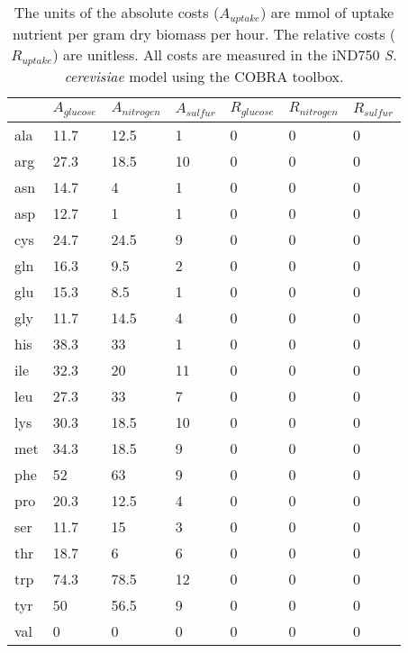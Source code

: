 \cleardoublepage

\begin{table}
\begin{footnotesize}
  \begin{tabular}{ p{1cm} *{6}{p{1.9cm}} }
  \toprule
      & $A_{glucose}$ & $A_{nitrogen}$ & $A_{sulfur}$ & $R_{glucose} $ & $R_{nitrogen}$ & $R_{sulfur}$ \\ \midrule
      ala & 11.7 & 12.5 & 1  & 0 & 0 & 0 \\
      arg & 27.3 & 18.5 & 10 & 0 & 0 & 0 \\
      asn & 14.7 & 4    & 1  & 0 & 0 & 0 \\
      asp & 12.7 & 1    & 1  & 0 & 0 & 0 \\
      cys & 24.7 & 24.5 & 9  & 0 & 0 & 0 \\
      gln & 16.3 & 9.5  & 2  & 0 & 0 & 0 \\
      glu & 15.3 & 8.5  & 1  & 0 & 0 & 0 \\
      gly & 11.7 & 14.5 & 4  & 0 & 0 & 0 \\
      his & 38.3 & 33   & 1  & 0 & 0 & 0 \\
      ile & 32.3 & 20   & 11 & 0 & 0 & 0 \\
      leu & 27.3 & 33   & 7  & 0 & 0 & 0 \\
      lys & 30.3 & 18.5 & 10 & 0 & 0 & 0 \\
      met & 34.3 & 18.5 & 9  & 0 & 0 & 0 \\
      phe & 52   & 63   & 9  & 0 & 0 & 0 \\
      pro & 20.3 & 12.5 & 4  & 0 & 0 & 0 \\
      ser & 11.7 & 15   & 3  & 0 & 0 & 0 \\
      thr & 18.7 & 6    & 6  & 0 & 0 & 0 \\
      trp & 74.3 & 78.5 & 12 & 0 & 0 & 0 \\
      tyr & 50   & 56.5 & 9  & 0 & 0 & 0 \\
      val & 0    & 0    & 0  & 0 & 0 & 0 \\ \bottomrule
  \end{tabular}
\end{footnotesize}
\label{appendix:table:estimated_amino_acid_costs}
\caption[\emph{S. cerevisiae} estimated absolute and relative amino acid costs]{The units of the absolute costs ($A_{uptake}$) are mmol of uptake nutrient per gram dry biomass per hour. The relative costs ($R_{uptake}$) are unitless. All costs are measured in the iND750 \emph{S. cerevisiae} model using the COBRA toolbox.} 
\end{table}
